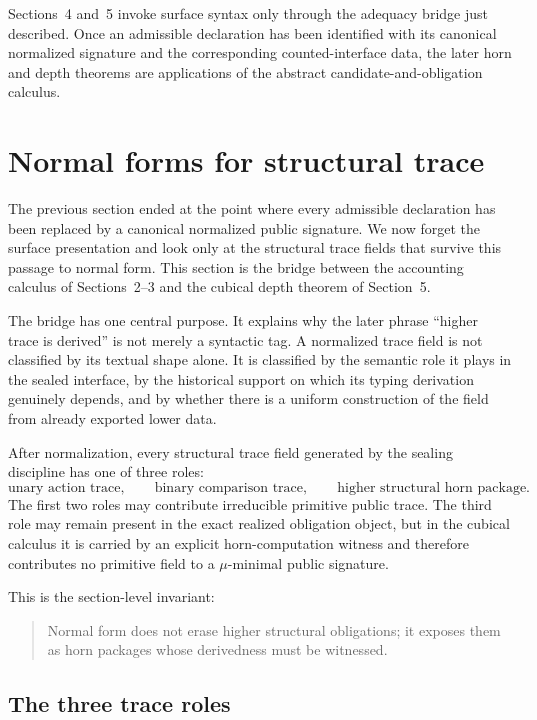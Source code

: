 \documentclass{lmcs}
\begin{document}
\begin{rem}
Sections~4 and~5 invoke surface syntax only through the adequacy bridge just described.  Once
an admissible declaration has been identified with its canonical normalized signature and the
corresponding counted-interface data, the later horn and depth theorems are applications of
the abstract candidate-and-obligation calculus.
\end{rem}

\section{Normal forms for structural trace}

The previous section ended at the point where every admissible declaration has been replaced
by a canonical normalized public signature.  We now forget the surface presentation and look
only at the structural trace fields that survive this passage to normal form.  This section is
the bridge between the accounting calculus of Sections~2--3 and the cubical depth theorem of
Section~5.

The bridge has one central purpose.  It explains why the later phrase ``higher trace is
derived'' is not merely a syntactic tag.  A normalized trace field is not classified by its
textual shape alone.  It is classified by the semantic role it plays in the sealed interface,
by the historical support on which its typing derivation genuinely depends, and by whether
there is a uniform construction of the field from already exported lower data.

After normalization, every structural trace field generated by the sealing discipline has one
of three roles:
\[
  \text{unary action trace},
  \qquad
  \text{binary comparison trace},
  \qquad
  \text{higher structural horn package}.
\]
The first two roles may contribute irreducible primitive public trace.  The third role may
remain present in the exact realized obligation object, but in the cubical calculus it is
carried by an explicit horn-computation witness and therefore contributes no primitive field
to a \(\mu\)-minimal public signature.

This is the section-level invariant:
\begin{quote}
Normal form does not erase higher structural obligations; it exposes them as horn packages
whose derivedness must be witnessed.
\end{quote}

\subsection{The three trace roles}
\end{document}
